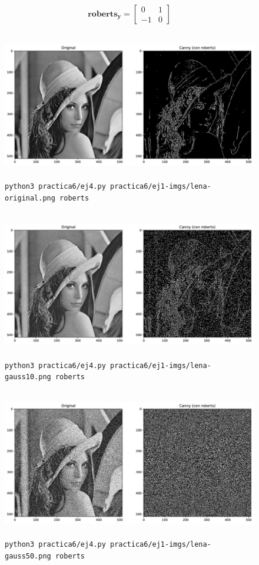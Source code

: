 \documentclass[11pt, spanish]{article}
\begin{document}
\[
\mathbf{roberts_y} = \begin{bmatrix} 
0 & 1 \\
-1 & 0
\end{bmatrix}
\]

\begin{figure}[H]
\centering
    \includegraphics[height=6.5cm]{informe-imgs/ej4-roberts-lena-original.jpg}
    \caption{\texttt{python3 practica6/ej4.py practica6/ej1-imgs/lena-original.png roberts}}
\end{figure}

\begin{figure}[H]
\centering
    \includegraphics[height=6.5cm]{informe-imgs/ej4-roberts-lena-gauss10.jpg}
    \caption{\texttt{python3 practica6/ej4.py practica6/ej1-imgs/lena-gauss10.png roberts}}
\end{figure}

\begin{figure}[H]
\centering
    \includegraphics[height=6.5cm]{informe-imgs/ej4-roberts-lena-gauss50.jpg}
    \caption{\texttt{python3 practica6/ej4.py practica6/ej1-imgs/lena-gauss50.png roberts}}
\end{figure}
\end{document}
